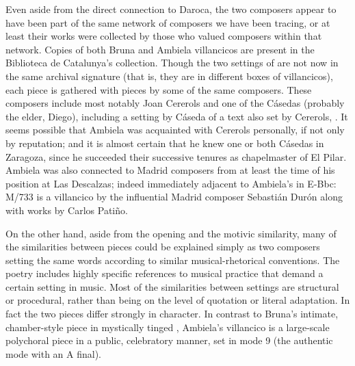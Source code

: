 Even aside from the direct connection to Daroca, the two composers appear to have been part of the same network of composers we have been tracing, or at least their works were collected by those who valued composers within that network.
Copies of both Bruna and Ambiela villancicos are present in the Biblioteca de Catalunya's collection.
Though the two settings of  are not now in the same archival signature (that is, they are in different boxes of villancicos), each piece is gathered with pieces by some of the same composers.
These composers include most notably Joan Cererols and one of the Cásedas (probably the elder, Diego), including a setting by Cáseda of a text also set by Cererols, .
It seems possible that Ambiela was acquainted with Cererols personally, if not only by reputation; and it is almost certain that he knew one or both Cásedas in Zaragoza, since he succeeded their successive tenures as chapelmaster of El Pilar.
Ambiela was also connected to Madrid composers from at least the time of his position at Las Descalzas; indeed immediately adjacent to Ambiela's  in E-Bbc: M/733 is a villancico by the influential Madrid composer Sebastián Durón along with works by Carlos Patiño.

On the other hand, aside from the opening and the motivic similarity, many of the similarities between pieces could be explained simply as two composers setting the same words according to similar musical-rhetorical conventions.
The poetry includes highly specific references to musical practice that demand a certain setting in music.
Most of the similarities between settings are structural or procedural, rather than being on the level of quotation or literal adaptation.
In fact the two pieces differ strongly in character.
In contrast to Bruna's intimate, chamber-style piece in mystically tinged , Ambiela's villancico is a large-scale polychoral piece in a public, celebratory manner, set in mode 9 (the authentic mode with an A final).

